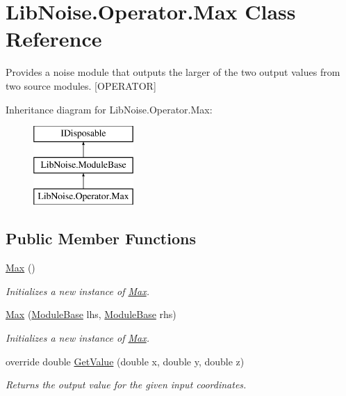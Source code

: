 \hypertarget{class_lib_noise_1_1_operator_1_1_max}{}\section{Lib\+Noise.\+Operator.\+Max Class Reference}
\label{class_lib_noise_1_1_operator_1_1_max}


Provides a noise module that outputs the larger of the two output values from two source modules. \mbox{[}O\+P\+E\+R\+A\+T\+OR\mbox{]}  


Inheritance diagram for Lib\+Noise.\+Operator.\+Max\+:\begin{figure}[H]
\begin{center}
\leavevmode
\includegraphics[height=3.000000cm]{class_lib_noise_1_1_operator_1_1_max}
\end{center}
\end{figure}
\subsection*{Public Member Functions}
\begin{DoxyCompactItemize}
\item 
\hyperlink{class_lib_noise_1_1_operator_1_1_max_a08acd86d5b4797df45cacc09aaca0d07}{Max} ()
\begin{DoxyCompactList}\small\item\em Initializes a new instance of \hyperlink{class_lib_noise_1_1_operator_1_1_max}{Max}. \end{DoxyCompactList}\item 
\hyperlink{class_lib_noise_1_1_operator_1_1_max_a5b6ee0fbc56ff7fa883d8fec7c42a89d}{Max} (\hyperlink{class_lib_noise_1_1_module_base}{Module\+Base} lhs, \hyperlink{class_lib_noise_1_1_module_base}{Module\+Base} rhs)
\begin{DoxyCompactList}\small\item\em Initializes a new instance of \hyperlink{class_lib_noise_1_1_operator_1_1_max}{Max}. \end{DoxyCompactList}\item 
override double \hyperlink{class_lib_noise_1_1_operator_1_1_max_a8a7f7064e51b54b3337b2bc9134f8c35}{Get\+Value} (double x, double y, double z)
\begin{DoxyCompactList}\small\item\em Returns the output value for the given input coordinates. \end{DoxyCompactList}\end{DoxyCompactItemize}

